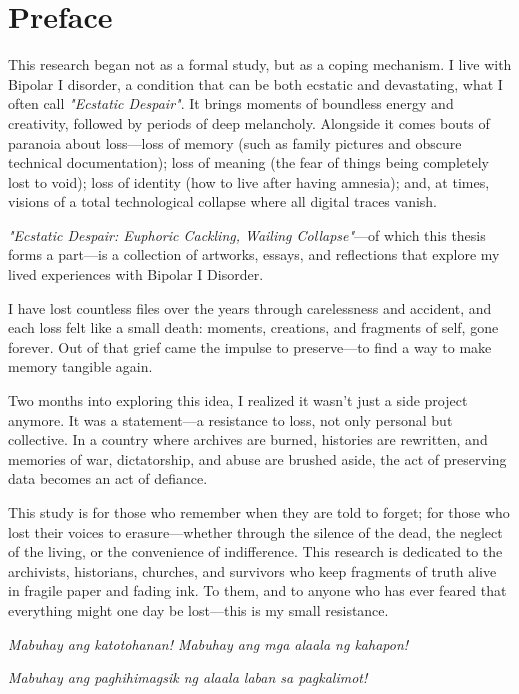 \documentclass[../1_thesis]{subfiles}
\begin{document}
\chapter*{Preface}

This research began not as a formal study, but as a coping mechanism. I live with Bipolar I disorder, a condition that can be both ecstatic and devastating, what I often call \textit{"Ecstatic Despair"}. It brings moments of boundless energy and creativity, followed by periods of deep melancholy. Alongside it comes bouts of paranoia about loss---loss of memory (such as family pictures and obscure technical documentation); loss of meaning (the fear of things being completely lost to void); loss of identity (how to live after having amnesia); and, at times, visions of a total technological collapse where all digital traces vanish.

\textit{"Ecstatic Despair: Euphoric Cackling, Wailing Collapse"}---of which this thesis forms a part---is a collection of artworks, essays, and reflections that explore my lived experiences with Bipolar I Disorder.

I have lost countless files over the years through carelessness and accident, and each loss felt like a small death: moments, creations, and fragments of self, gone forever. Out of that grief came the impulse to preserve---to find a way to make memory tangible again.

Two months into exploring this idea, I realized it wasn't just a side project anymore. It was a statement---a resistance to loss, not only personal but collective. In a country where archives are burned, histories are rewritten, and memories of war, dictatorship, and abuse are brushed aside, the act of preserving data becomes an act of defiance.

This study is for those who remember when they are told to forget; for those who lost their voices to erasure---whether through the silence of the dead, the neglect of the living, or the convenience of indifference. This research is dedicated to the archivists, historians, churches, and survivors who keep fragments of truth alive in fragile paper and fading ink. To them, and to anyone who has ever feared that everything might one day be lost---this is my small resistance.

\textit{Mabuhay ang katotohanan! Mabuhay ang mga alaala ng kahapon!}

\textit{Mabuhay ang paghihimagsik ng alaala laban sa pagkalimot!}
\end{document}
